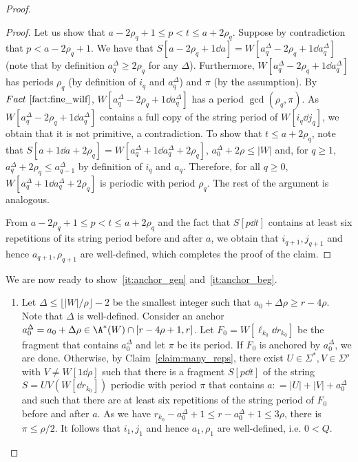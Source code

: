 \begin{proof}
\begin{proof}
Let us show that $a-2\rho_q+1 \le p < t \le a+2\rho_q$. Suppose by contradiction that $p < a-2\rho_q+1$. We have that $S[a-2\rho_q+1 \dd a] = W[a_q^\Delta-2\rho_q+1 \dd a_q^\Delta]$ (note that by definition $a_q^\Delta \ge 2 \rho_q$ for any $\Delta$). Furthermore, $W[a_q^\Delta-2\rho_q+1 \dd a_q^\Delta]$ has periods $\rho_q$ (by definition of $i_q$ and $a_q^\Delta$) and $\pi$ (by the assumption). By $Fact~\ref{fact:fine_wilf}$, $W[a_q^\Delta-2\rho_q+1 \dd a_q^\Delta]$ has a period $\gcd(\rho_q, \pi)$. As $W[a_q^\Delta-2\rho_q+1 \dd a_q^\Delta]$ contains a full copy of the string period of $W[i_q \dd j_q]$, we obtain that it is not primitive, a contradiction. To show that $t \le a+2\rho_q$, note that $S[a+1 \dd a+2\rho_q] = W[a_q^\Delta+1 \dd a_q^\Delta+2\rho_q]$, $a_0^\Delta+2\rho \le |W|$ and, for $q\ge 1$, $a_q^\Delta+2\rho_q \le a_{q-1}^\Delta$ by definition of $i_q$ and $a_q$. Therefore, for all $q \ge 0$, $W[a_q^\Delta+1 \dd a_q^\Delta+2\rho_q]$ is periodic with period $\rho_q$. The rest of the argument is analogous. 

From $a-2\rho_q+1 \le p < t \le a+2\rho_q$ and the fact that $S[p \dd t]$ contains at least six repetitions of its string period before and after $a$, we obtain that $i_{q+1}, j_{q+1}$ and hence $a_{q+1}, \rho_{q+1}$ are well-defined, which completes the proof of the claim.  
\end{proof}

We are now ready to show~\ref{it:anchor_gen} and~\ref{it:anchor_beg}. 

\begin{enumerate}[label=\textrm{(\alph*)}]
\item Let $\Delta \le \lfloor |W|/\rho\rfloor-2$ be the smallest integer such that $a_0+\Delta \rho \ge r-4\rho$. Note that $\Delta$ is well-defined. 
 Consider an anchor $a_0^\Delta = a_0+\Delta \rho \in \A^\ast(W) \cap [r-4\rho+1, r]$. Let $F_0 = W[\ell_{k_0} \dd r_{k_0}]$ be the fragment that contains $a_0^\Delta$ and let $\pi$ be its period. If $F_0$ is anchored by $a_0^\Delta$, we are done. Otherwise, by Claim~\ref{claim:many_reps}, there exist $U \in \Sigma^\ast, V \in \Sigma^\rho$ with $V \neq W[1 \dd \rho]$ such that there is a fragment $S[p \dd t]$ of the string $S = UV(W[\dd r_{k_0}])$ periodic with period $\pi$ that contains $a: = |U|+|V|+a_0^\Delta$ and such that there are at least six repetitions of the string period of $F_0$ before and after $a$. As we have $r_{k_0}-a_0^\Delta+1 \le r-a_0^\Delta+1 \le 3\rho$, there is $\pi \le \rho/2$. It follows that $i_1, j_1$ and hence $a_1, \rho_1$ are well-defined, i.e. $0 < Q$. 


\end{enumerate}
\end{proof}
